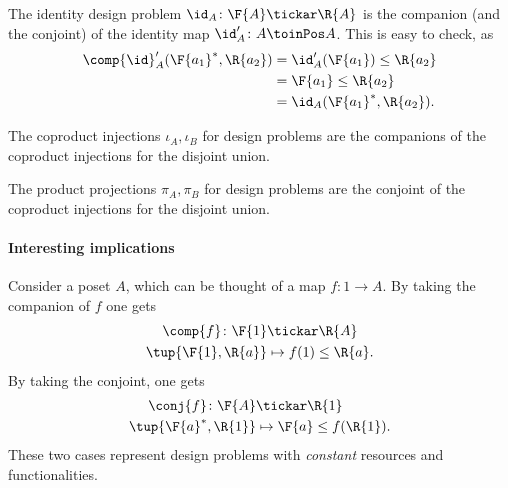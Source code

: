 \begin{example}The identity design problem $\id_A\colon \F{A} \tickar \R{A}$ is the companion (and the conjoint) of the identity map $\id_A'\colon A \toinPos A$. This is easy to check, as
\begin{equation}
    \begin{aligned}
    \comp{\id}_A'(\F{a_1}^*,\R{a_2})&=\id_A'(\F{a_1})\leq \R{a_2}\\
    &=\F{a_1}\leq \R{a_2}\\
    &=\id_A(\F{a_1}^*,\R{a_2}).
    \end{aligned}
\end{equation}
\end{example}

\begin{example}The coproduct injections $\iota_A, \iota_B$ for design problems are the companions of the coproduct injections for the disjoint union.
\end{example}

\begin{example}The product projections $\pi_A, \pi_B$ for design problems are the conjoint of the coproduct injections for the disjoint union.
\end{example}


\paragraph{Interesting implications}
Consider a poset $A$, which can be thought of a map $f\colon 1\to A$. By taking the companion of $f$ one gets
\begin{equation}
\begin{aligned}
    \comp{f}\colon \F{1}&\tickar \R{A}\\
    \tup{\F{1},\R{a}}&\mapsto f(1)\leq \R{a}.
\end{aligned}
\end{equation}
By taking the conjoint, one gets
\begin{equation}
\begin{aligned}
    \conj{f}\colon \F{A}&\tickar \R{1}\\
    \tup{\F{a}^*,\R{1}}&\mapsto \F{a}\leq f(\R{1}).
\end{aligned}
\end{equation}
These two cases represent design problems with \emph{constant} resources and functionalities.

